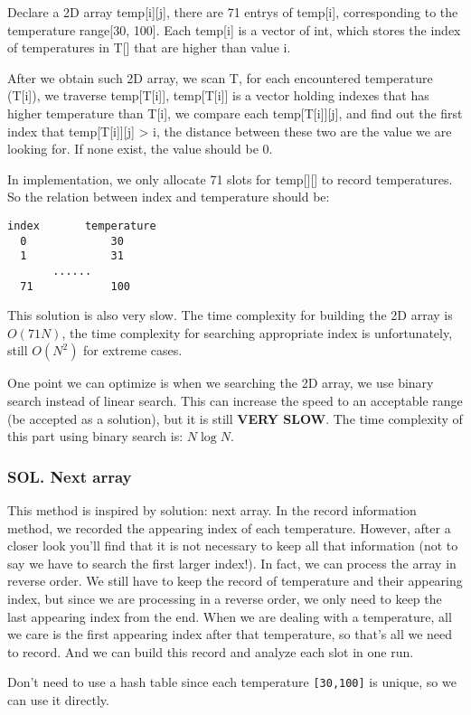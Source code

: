 \documentclass[11pt]{article}
\begin{document}
Declare a 2D array temp[i][j], there are 71 entrys of temp[i], corresponding to the temperature range[30, 100]. Each temp[i] is a vector of int, which stores the index of temperatures in T[] that are higher than value i.

After we obtain such 2D array, we scan T, for each encountered temperature (T[i]), we traverse temp[T[i]], temp[T[i]] is a vector holding indexes that has higher temperature than T[i], we compare each temp[T[i]][j], and find out the first index that temp[T[i]][j] > i, the distance between these two are the value we are looking for. If none exist, the value should be 0.

In implementation, we only allocate 71 slots for temp[][] to record temperatures. So the relation between index and temperature should be:
\begin{Verbatim}[frame=single]
index       temperature
  0             30
  1             31
       ......
  71            100  
\end{Verbatim}

This solution is also very slow. The time complexity for building the 2D array is \(O(71N)\), the time complexity for searching appropriate index is unfortunately, still \(O(N^2)\) for extreme cases.

One point we can optimize is when we searching the 2D array, we use binary search instead of linear search. This can increase the speed to an acceptable range (be accepted as a solution), but it is still \textbf{VERY SLOW}. The time complexity of this part using binary search is: \(N\log{N}\).
\subsubsection{SOL. Next array}
\label{sec:orgab53ca3}
This method is inspired by solution: next array. In the record information method, we recorded the appearing index of each temperature. However, after a closer look you'll find that it is not necessary to keep all that information (not to say we have to search the first larger index!). In fact, we can process the array in reverse order. We still have to keep the record of temperature and their appearing index, but since we are processing in a reverse order, we only need to keep the last appearing index from the end. When we are dealing with a temperature, all we care is the first appearing index after that temperature, so that's all we need to record. And we can build this record and analyze each slot in one run.

Don't need to use a hash table since each temperature \texttt{[30,100]} is unique, so we can use it directly.
\end{document}

